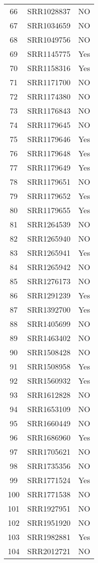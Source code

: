 \begin{longtable}{ccc}
  66 & SRR1028837 & NO \\ 
  67 & SRR1034659 & NO \\ 
  68 & SRR1049756 & NO \\ 
  69 & SRR1145775 & Yes \\ 
  70 & SRR1158316 & Yes \\ 
  71 & SRR1171700 & NO \\ 
  72 & SRR1174380 & NO \\ 
  73 & SRR1176843 & NO \\ 
  74 & SRR1179645 & NO \\ 
  75 & SRR1179646 & Yes \\ 
  76 & SRR1179648 & Yes \\ 
  77 & SRR1179649 & Yes \\ 
  78 & SRR1179651 & NO \\ 
  79 & SRR1179652 & Yes \\ 
  80 & SRR1179655 & Yes \\ 
  81 & SRR1264539 & NO \\ 
  82 & SRR1265940 & NO \\ 
  83 & SRR1265941 & Yes \\ 
  84 & SRR1265942 & NO \\ 
  85 & SRR1276173 & NO \\ 
  86 & SRR1291239 & Yes \\ 
  87 & SRR1392700 & Yes \\ 
  88 & SRR1405699 & NO \\ 
  89 & SRR1463402 & NO \\ 
  90 & SRR1508428 & NO \\ 
  91 & SRR1508958 & Yes \\ 
  92 & SRR1560932 & Yes \\ 
  93 & SRR1612828 & NO \\ 
  94 & SRR1653109 & NO \\ 
  95 & SRR1660449 & NO \\ 
  96 & SRR1686960 & Yes \\ 
  97 & SRR1705621 & NO \\ 
  98 & SRR1735356 & NO \\ 
  99 & SRR1771524 & Yes \\ 
  100 & SRR1771538 & NO \\ 
  101 & SRR1927951 & NO \\ 
  102 & SRR1951920 & NO \\ 
  103 & SRR1982881 & Yes \\ 
  104 & SRR2012721 & NO \\ 

\end{longtable}

